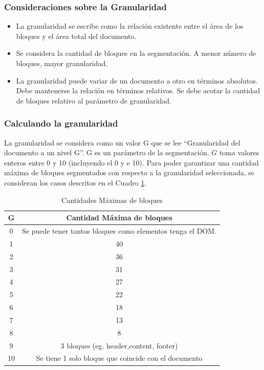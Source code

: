 \documentclass[10pt]{revecom}
\begin{document}
\subsubsection{Consideraciones sobre la Granularidad}
\begin{itemize}
\item La granularidad se escribe como la relación existente entre el área de los bloques y el área total del documento. 
%
\item Se considera la cantidad de bloques en la segmentación. A menor número de bloques, mayor granularidad.
%
\item La granularidad puede variar de un documento a otro en términos absolutos. Debe mantenerse la relación en términos relativos. 
Se debe acotar la cantidad de bloques relativo al parámetro de granularidad. 
\end{itemize}

\subsubsection{Calculando la granularidad}

La granularidad se considera como un valor G que se lee ``Granularidad del documento a un nivel G''. G es un parámetro de la segmentación.
$G$ toma valores enteros entre 0 y 10 (incluyendo el 0 y e 10). 
Para poder garantizar una cantidad máxima de bloques segmentados con respecto a la granularidad seleccionada, se consideran los casos descritos en el Cuadro \ref{tab:calc_granularidad}.
\begin{table}[!h]
\caption{Cantidades Máximas de bloques}
\label{tab:calc_granularidad}
\centering
\begin{tabular}{|c|c|}
\hline
\textbf{G} & \textbf{Cantidad Máxima de bloques} \\ \hline
0 & Se puede tener tantos bloques como elementos tenga el DOM. \\ \hline
1 & 40 \\ \hline
2 & 36 \\ \hline
3 &  31 \\ \hline
4 &  27 \\ \hline
5 &  22 \\ \hline
6 &  18 \\ \hline
7 & 13 \\ \hline
8 &  8 \\ \hline
9 & 3 bloques (eg. header,content, footer) \\ \hline
10 & Se tiene 1 solo bloque que coincide con el documento  \\
\hline
\end{tabular}
\end{table}
\end{document}
